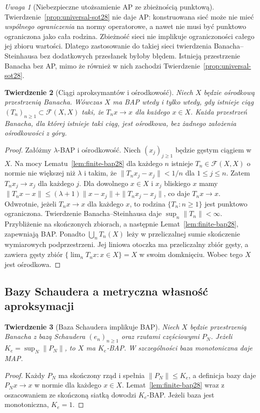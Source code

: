 \documentclass[11pt,a4paper]{article}
\numberwithin{equation}{section}
\theoremstyle{plain}
\newtheorem{twierdzenie}{Twierdzenie}[section]
\theoremstyle{definition}
\theoremstyle{remark}
\newtheorem{uwaga}[twierdzenie]{Uwaga}
\begin{document}
\begin{uwaga}[Niebezpieczne utożsamienie AP ze zbieżnością punktową]
\label{rem:net-vs-ap28}
Twierdzenie~\ref{prop:universal-sot28} nie daje AP:
konstruowana sieć może nie mieć \emph{wspólnego ograniczenia}
na normy operatorowe, a nawet nie musi być punktowo
ograniczona jako cała rodzina. Zbieżność sieci nie implikuje
ograniczoności całego jej zbioru wartości. Dlatego
zastosowanie do takiej sieci twierdzenia Banacha--Steinhausa
bez dodatkowych przesłanek byłoby błędem.
Istnieją przestrzenie Banacha bez AP, mimo że również
w nich zachodzi Twierdzenie~\ref{prop:universal-sot28}.
\end{uwaga}

\begin{twierdzenie}[Ciągi aproksymantów i ośrodkowość]
\label{thm:sequence-bap28}
Niech $X$ będzie ośrodkową przestrzenią Banacha.
Wówczas $X$ ma BAP wtedy i tylko wtedy, gdy istnieje
\emph{ciąg} $(T_n)_{n\ge1}\subset\mathcal F(X,X)$
taki, że $T_nx\to x$ dla każdego $x\in X$.
Każda przestrzeń Banacha, dla której istnieje taki ciąg,
jest ośrodkowa, bez żadnego założenia ośrodkowości z góry.
\end{twierdzenie}
\begin{proof}
Załóżmy $\lambda$-BAP i ośrodkowość.
Niech $(x_j)_{j\ge1}$ będzie gęstym ciągiem w $X$.
Na mocy Lematu~\ref{lem:finite-bap28} dla każdego $n$
istnieje $T_n\in\mathcal F(X,X)$ o normie nie większej
niż $\lambda$ i takim, że $\|T_nx_j-x_j\|<1/n$
dla $1\le j\le n$. Zatem $T_nx_j\to x_j$ dla każdego $j$.
Dla dowolnego $x\in X$ i $x_j$ bliskiego $x$ mamy
$\|T_nx-x\|\le(\lambda+1)\|x-x_j\|+\|T_nx_j-x_j\|$,
co daje $T_nx\to x$.
Odwrotnie, jeżeli $T_nx\to x$ dla każdego $x$, to rodzina
$\{T_n:n\ge1\}$ jest punktowo ograniczona. Twierdzenie
Banacha--Steinhausa daje $\sup_n\|T_n\|<\infty$.
Przybliżenie na skończonych zbiorach, a następnie
Lemat~\ref{lem:finite-bap28}, zapewniają BAP.
Ponadto $\bigcup_nT_n(X)$ leży w przeliczalnej sumie
skończenie wymiarowych podprzestrzeni. Jej liniowa otoczka
ma przeliczalny zbiór gęsty, a zawiera gęsty zbiór
$\{\lim_nT_nx:x\in X\}=X$ w swoim domknięciu.
Wobec tego $X$ jest ośrodkowa.
\end{proof}

\subsection{Bazy Schaudera a metryczna własność aproksymacji}

\begin{twierdzenie}[Baza Schaudera implikuje BAP]
\label{thm:basis-implies-bap28}
Niech $X$ będzie przestrzenią Banacha z bazą Schaudera
$(e_n)_{n\ge1}$ oraz rzutami częściowymi $P_N$.
Jeżeli $K_e=\sup_N\|P_N\|$, to $X$ ma $K_e$-BAP.
W szczególności baza monotoniczna daje MAP.
\end{twierdzenie}
\begin{proof}
Każdy $P_N$ ma skończony rząd i spełnia
$\|P_N\|\le K_e$, a definicja bazy daje
$P_Nx\to x$ w normie dla każdego $x\in X$.
Lemat~\ref{lem:finite-bap28} wraz z oszacowaniem
ze skończoną siatką dowodzi $K_e$-BAP.
Jeżeli baza jest monotoniczna, $K_e=1$.
\end{proof}
\end{document}
